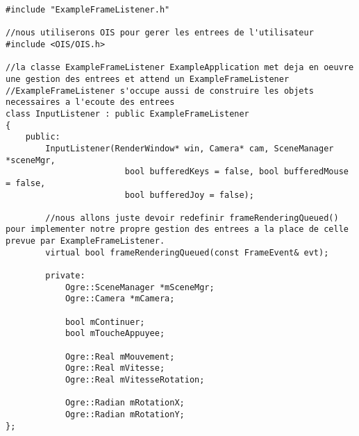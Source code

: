 \begin{lstlisting}[caption={InputListener.h}]
#include "ExampleFrameListener.h"

//nous utiliserons OIS pour gerer les entrees de l'utilisateur
#include <OIS/OIS.h>

//la classe ExampleFrameListener ExampleApplication met deja en oeuvre une gestion des entrees et attend un ExampleFrameListener
//ExampleFrameListener s'occupe aussi de construire les objets necessaires a l'ecoute des entrees
class InputListener : public ExampleFrameListener
{
    public:
        InputListener(RenderWindow* win, Camera* cam, SceneManager *sceneMgr, 
                        bool bufferedKeys = false, bool bufferedMouse = false, 
                        bool bufferedJoy = false);
        
        //nous allons juste devoir redefinir frameRenderingQueued() pour implementer notre propre gestion des entrees a la place de celle prevue par ExampleFrameListener.
        virtual bool frameRenderingQueued(const FrameEvent& evt);

        private:
            Ogre::SceneManager *mSceneMgr;
            Ogre::Camera *mCamera;
            
            bool mContinuer;
            bool mToucheAppuyee;

            Ogre::Real mMouvement;
            Ogre::Real mVitesse;
            Ogre::Real mVitesseRotation;

            Ogre::Radian mRotationX;
            Ogre::Radian mRotationY;
};
\end{lstlisting}


